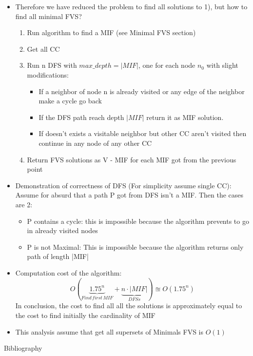 \documentclass[11pt]{beamer}
\begin{document}
	\begin{frame}
		\begin{itemize}
			\item Therefore we have reduced the problem to find all solutions to 1), but how to find all minimal FVS?
			\begin{enumerate}
				\item Run algorithm to find a MIF (see Minimal FVS section)
				\item Get all CC
				\item Run n DFS with $ max\_depth=|MIF| $, one for each node $ n_0 $ with slight modifications:
				\begin{itemize}
					\item If a neighbor of node n is already visited or any edge of the neighbor make a cycle go back
					\item If the DFS path reach depth $ |MIF| $ return it as MIF solution.
					\item If doesn't exists a visitable neighbor but other CC aren't visited then continue in any node of any other CC
				\end{itemize}
				\item Return FVS solutions as V - MIF for each MIF got from the previous point
			\end{enumerate}
		\end{itemize}
	\end{frame}
	\begin{frame}
		\begin{itemize}
			\item Demonstration of correctness of DFS (For simplicity assume single CC): Assume for absurd that a path P got from DFS isn't a MIF. Then the cases are 2:
			\begin{itemize}
				\item P contains a cycle: this is impossible because the algorithm prevents to go in already visited nodes
				\item  P is not Maximal: This is impossible because the algorithm returns only path of length |MIF|
			\end{itemize}
			\item Computation cost of the algorithm: $$ O( \underbrace{1.75 ^ n}_{Find \, first \, MIF} + \underbrace{n \cdot |MIF|}_{DFSs})  \approxeq O(1.75^n) $$
			 In conclusion, the cost to find all all the solutions is approximately equal to the cost to find initially the cardinality of MIF
			 \item This analysis assume that get all supersets of Minimals FVS is $ O(1) $ 
		 	\end{itemize}
	\end{frame}
	\begin{frame}{Bibliography}
		\printbibliography
	\end{frame}
\end{document}
